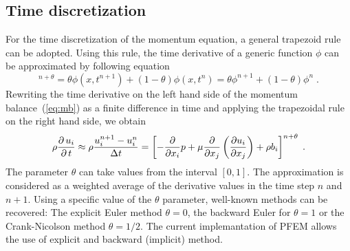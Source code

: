 \subsection{Time discretization}
For the time discretization of the momentum equation, a general trapezoid rule can be adopted. Using this rule, the time derivative of a generic function $\phi$ can be approximated by following equation
\begin{equation}
[\phi(x,t)]^{n+\theta} = \theta\phi(x,t^{n+1})+(1-\theta)\phi(x,t^n)=\theta\phi^{n+1}+(1-\theta)\phi^n\;.
\end{equation}
Rewriting the time derivative on the left hand side of the momentum balance~(\ref{eq:mb}) as a finite difference in time and applying the trapezoidal rule on the right hand side, we obtain
\begin{equation}\label{eq:momentum-general}
  \rho\mbox{$\displaystyle\frac{\partial \,{u_i}}{\partial \,{t}}$} \approx \rho\frac{u^{n+1}_i-u^n_i}{\Delta t}= \left[ - \frac{\partial}{\partial x_i}p+\mu\frac{\partial}{\partial x_j}\left(\frac{\partial u_i}{\partial x_j}\right)+\rho b_i\right]^{n+\theta}\;.
\end{equation}
The parameter $\theta$ can take values from the interval $[0,1]$.  The approximation is considered as a weighted average of the derivative values in the time step $n$ and $n+1$. Using a specific value of the $\theta$ parameter, well-known methods can be recovered: The explicit Euler method $\theta=0$, the backward Euler for $\theta=1$ or the Crank-Nicolson method $\theta=1/2$. The current implemantation of PFEM allows the use of explicit and backward (implicit) method.

